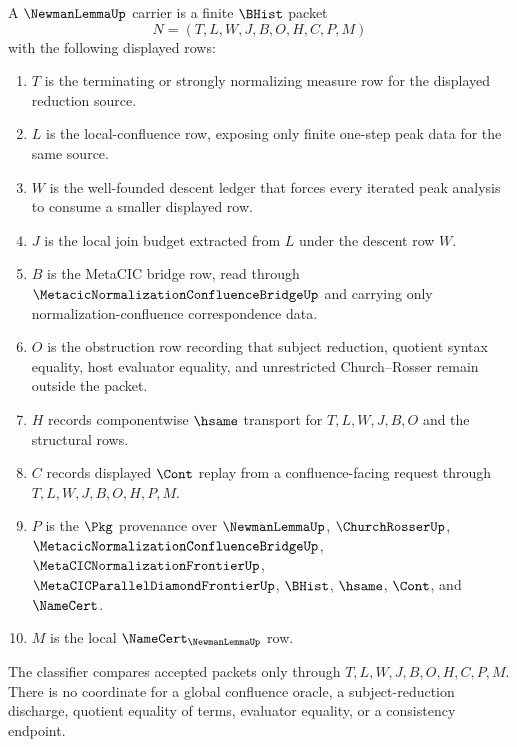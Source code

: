 \begin{definition}
\label{def:newman-lemma-carrier}
A $\NewmanLemmaUp$ carrier is a finite $\BHist$ packet
$$
N=(T,L,W,J,B,O,H,C,P,M)
$$
with the following displayed rows:
\begin{enumerate}
\item $T$ is the terminating or strongly normalizing measure row for the displayed reduction source.
\item $L$ is the local-confluence row, exposing only finite one-step peak data for the same source.
\item $W$ is the well-founded descent ledger that forces every iterated peak analysis to consume a smaller displayed row.
\item $J$ is the local join budget extracted from $L$ under the descent row $W$.
\item $B$ is the MetaCIC bridge row, read through $\MetacicNormalizationConfluenceBridgeUp$ and carrying only normalization-confluence correspondence data.
\item $O$ is the obstruction row recording that subject reduction, quotient syntax equality, host evaluator equality, and unrestricted Church--Rosser remain outside the packet.
\item $H$ records componentwise $\hsame$ transport for $T,L,W,J,B,O$ and the structural rows.
\item $C$ records displayed $\Cont$ replay from a confluence-facing request through $T,L,W,J,B,O,H,P,M$.
\item $P$ is the $\Pkg$ provenance over $\NewmanLemmaUp$, $\ChurchRosserUp$, $\MetacicNormalizationConfluenceBridgeUp$, $\MetaCICNormalizationFrontierUp$, $\MetaCICParallelDiamondFrontierUp$, $\BHist$, $\hsame$, $\Cont$, and $\NameCert$.
\item $M$ is the local $\NameCert_{\NewmanLemmaUp}$ row.
\end{enumerate}
The classifier compares accepted packets only through $T,L,W,J,B,O,H,C,P,M$. There is no coordinate for a global confluence oracle, a subject-reduction discharge, quotient equality of terms, evaluator equality, or a consistency endpoint.
\end{definition}

